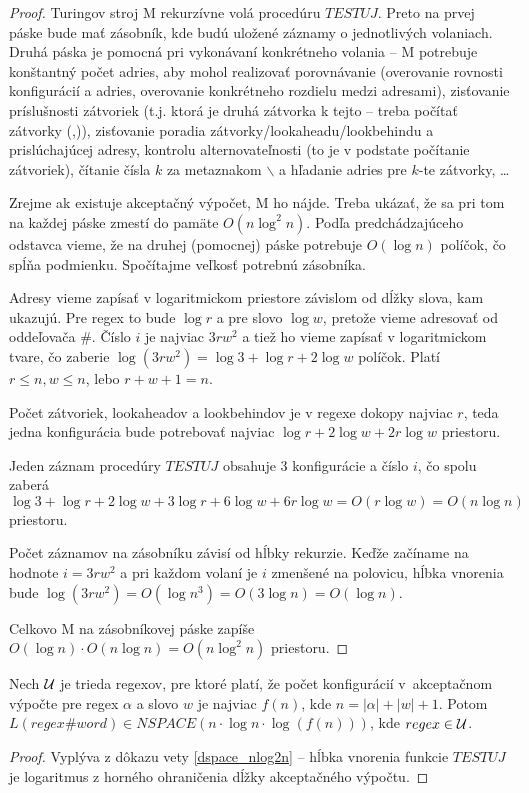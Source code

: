 \begin{proof}
Turingov stroj M rekurzívne volá procedúru $TESTUJ$. Preto na prvej páske bude mať zásobník, kde budú uložené záznamy o jednotlivých volaniach. Druhá páska je pomocná pri vykonávaní konkrétneho volania -- M potrebuje konštantný počet adries, aby mohol realizovať porovnávanie (overovanie rovnosti konfigurácií a adries, overovanie konkrétneho rozdielu medzi adresami), zisťovanie príslušnosti zátvoriek (t.j. ktorá je druhá zátvorka k tejto -- treba počítať zátvorky (,)), zisťovanie poradia zátvorky/lookaheadu/lookbehindu a prislúchajúcej adresy, kontrolu alternovateľnosti (to je v podstate počítanie zátvoriek), čítanie čísla $k$ za metaznakom $\backslash$ a hľadanie adries pre $k$-te zátvorky, \dots

Zrejme ak existuje akceptačný výpočet, M ho nájde. Treba ukázať, že sa pri tom na každej páske zmestí do pamäte $O(n\log^2 n)$. Podľa predchádzajúceho odstavca vieme, že na druhej (pomocnej) páske potrebuje $O(\log n)$ políčok, čo spĺňa podmienku. Spočítajme veľkosť potrebnú zásobníka.

Adresy vieme zapísať v logaritmickom priestore závislom od dĺžky slova, kam ukazujú. Pre regex to bude $\log r$ a pre slovo $\log w$, pretože vieme adresovať od oddeľovača \#. Číslo $i$ je najviac $3rw^2$ a tiež ho vieme zapísať v logaritmickom tvare, čo zaberie $\log (3rw^2) = \log 3 + \log r + 2\log w$ políčok. Platí $r\leq n, w\leq n$, lebo $r+w+1=n$.

Počet zátvoriek, lookaheadov a lookbehindov je v regexe dokopy najviac $r$, teda jedna konfigurácia bude potrebovať najviac $\log r + 2\log w + 2r\log w$ priestoru.

Jeden záznam procedúry $TESTUJ$ obsahuje 3 konfigurácie a číslo $i$, čo spolu zaberá $\log 3+\log r + 2\log w + 3\log r + 6\log w + 6r\log w = O(r\log w) = O(n\log n)$ priestoru.

Počet záznamov na zásobníku závisí od hĺbky rekurzie. Keďže začíname na hodnote $i=3rw^2$ a pri každom volaní je $i$ zmenšené na polovicu, hĺbka vnorenia bude $\log(3rw^2)=O(\log n^3) = O(3\log n) = O(\log n)$.

Celkovo M na zásobníkovej páske zapíše $O(\log n)\cdot O(n\log n) = O(n\log^2 n)$ priestoru.
\end{proof}

\begin{dosledok}
Nech $\cal U$ je trieda regexov, pre ktoré platí, že počet konfigurácií v~akceptačnom výpočte pre regex $\alpha$ a slovo $w$ je najviac $f(n)$, kde $n=|\alpha|+|w|+1$. Potom $L(regex\#word)\in NSPACE(n\cdot\log n\cdot \log (f(n)))$, kde $regex \in \cal U$.
\end{dosledok}
\begin{proof}
Vyplýva z dôkazu vety \ref{dspace_nlog2n} -- hĺbka vnorenia funkcie $TESTUJ$ je logaritmus z horného ohraničenia dĺžky akceptačného výpočtu.
\end{proof}

